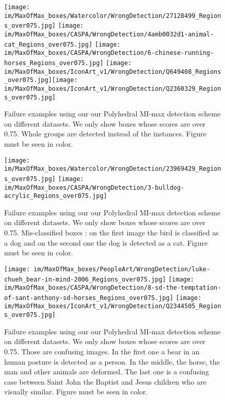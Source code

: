 \documentclass[preprint]{elsarticle}
\newcommand\MaxOfMaxS{Polyhedral MI-max}
\newcommand{\heightimageWatercolor}{2cm}
\begin{document}
\begin{figure}
\centering
  \hfill
  \texttt{[image: im/MaxOfMax\_boxes/Watercolor/WrongDetection/27128499\_Regions\_over075.jpg]}\hfill
     \texttt{[image: im/MaxOfMax\_boxes/CASPA/WrongDetection/4amb0032d1-animal-cat\_Regions\_over075.jpg]}\hfill
     \texttt{[image: im/MaxOfMax\_boxes/CASPA/WrongDetection/6-chinese-running-horses\_Regions\_over075.jpg]}\hfill
          \texttt{[image: im/MaxOfMax\_boxes/IconArt\_v1/WrongDetection/Q649408\_Regions\_over075.jpg]}\hfill \texttt{[image: im/MaxOfMax\_boxes/IconArt\_v1/WrongDetection/Q2360329\_Regions\_over075.jpg]}\hfill \caption{Failure examples using our our \MaxOfMaxS{} detection scheme on different datasets. We only show boxes whose scores are over 0.75. Whole groups are detected instead of the instances. Figure must be seen in color.}
    \label{fig:detectionWholeGroup}
\end{figure}


\begin{figure}
\centering
  \hfill
     \texttt{[image: im/MaxOfMax\_boxes/Watercolor/WrongDetection/23969429\_Regions\_over075.jpg]}\hfill 
     \texttt{[image: im/MaxOfMax\_boxes/CASPA/WrongDetection/3-bulldog-acrylic\_Regions\_over075.jpg]}\hfill
    \caption{Failure examples using our our \MaxOfMaxS{} detection scheme on different datasets. We only show boxes whose scores are over 0.75. Mis-classified boxes : on the first image the bird is classified as a dog and on the second one the dog is detected as a cat. Figure must be seen in color.}
    \label{fig:MisClassified}
\end{figure}

\begin{figure}
\centering
  \hfill
     \texttt{[image: im/MaxOfMax\_boxes/PeopleArt/WrongDetection/luke-chueh\_bear-in-mind-2006\_Regions\_over075.jpg]}\hfill
         \texttt{[image: im/MaxOfMax\_boxes/CASPA/WrongDetection/8-sd-the-temptation-of-sant-anthony-sd-horses\_Regions\_over075.jpg]}\hfill 
             \texttt{[image: im/MaxOfMax\_boxes/IconArt\_v1/WrongDetection/Q2344505\_Regions\_over075.jpg]}\hfill  \caption{Failure examples using our our \MaxOfMaxS{} detection scheme on different datasets. We only show boxes whose scores are over 0.75. Those are confusing images. In the first one a bear in an human posture is detected as a person. In the middle, the horse, the man and other animals are deformed. The last one is a confusing case between Saint John the Baptist and Jesus children who are visually similar. Figure must be seen in color.}
    \label{fig:ConfusingImages}
\end{figure}
\end{document}
